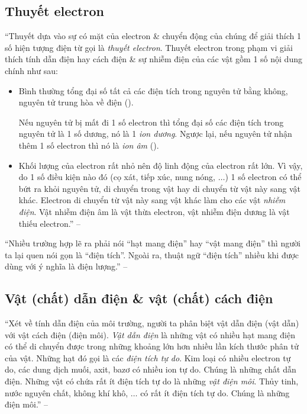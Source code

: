 \documentclass[oneside]{book}
\numberwithin{equation}{section}
\begin{document}
\subsection{Thuyết electron}
``Thuyết dựa vào sự có mặt của electron \& chuyển động của chúng để giải thích 1 số hiện tượng điện từ gọi là \textit{thuyết electron}. Thuyết electron trong phạm vi giải thích tính dẫn điện hay cách điện \& sự nhiễm điện của các vật gồm 1 số nội dung chính như sau:
\begin{itemize}
	\item Bình thường tổng đại số tất cả các điện tích trong nguyên tử bằng không, nguyên tử trung hòa về điện (\cite[Hình 2.1: \textsf{Mô hình đơn giản của nguyên tử liti}, p. 10]{SGK_Vat_Ly_11_nang_cao}).
	
	Nếu nguyên tử bị mất đi 1 số electron thì tổng đại số các điện tích trong nguyên tử là 1 số dương, nó là 1 \textit{ion dương}. Ngược lại, nếu nguyên tử nhận thêm 1 số electron thì nó là \textit{ion âm} (\cite[Hình 2.2: \textsf{Mô hình đơn giản của nguyên tử liti. (a) ion dương liti; (b) ion âm liti}, p. 10]{SGK_Vat_Ly_11_nang_cao}).
	\item Khối lượng của electron rất nhỏ nên độ linh động của electron rất lớn. Vì vậy, do 1 số điều kiện nào đó (cọ xát, tiếp xúc, nung nóng, $\ldots$) 1 số electron có thể bứt ra khỏi nguyên tử, di chuyển trong vật hay di chuyển từ vật này sang vật khác. Electron di chuyển từ vật này sang vật khác làm cho các vật \textit{nhiễm điện}. Vật nhiễm điện âm là vật thừa electron, vật nhiễm điện dương là vật thiếu electron.'' -- \cite[p. 10]{SGK_Vat_Ly_11_nang_cao}
\end{itemize}
``Nhiều trường hợp lẽ ra phải nói ``hạt mang điện'' hay ``vật mang điện'' thì người ta lại quen nói gọn là ``điện tích''. Ngoài ra, thuật ngữ ``điện tích'' nhiều khi được dùng với ý nghĩa là điện lượng.'' -- \cite[p. 10]{SGK_Vat_Ly_11_nang_cao}

\subsection{Vật (chất) dẫn điện \& vật (chất) cách điện}
``Xét về tính dẫn điện của môi trường, người ta phân biệt vật dẫn điện (vật dẫn) với vật cách điện (điện môi). \textit{Vật dẫn điện} là những vật có nhiều hạt mang điện có thể di chuyển được trong những khoảng lớn hơn nhiều lần kích thước phân tử của vật. Những hạt đó gọi là các \textit{điện tích tự do}. Kim loại có nhiều electron tự do, các dung dịch muối, axit, bazơ có nhiều ion tự do. Chúng là những chất dẫn điện. Những vật có chứa rất ít điện tích tự do là những \textit{vật điện môi}. Thủy tinh, nước nguyên chất, không khí khô, $\ldots$ có rất ít điện tích tự do. Chúng là những điện môi.'' -- \cite[pp. 10--11]{SGK_Vat_Ly_11_nang_cao}
\end{document}
